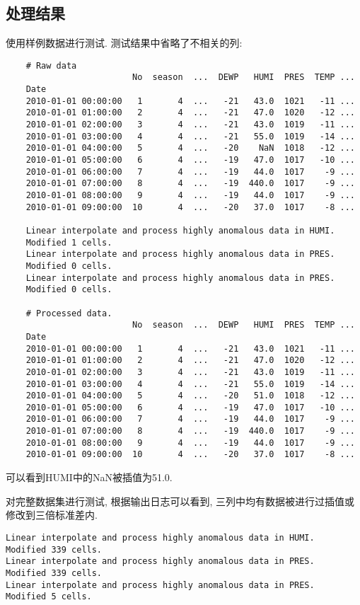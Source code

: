 \subsection{处理结果}
使用样例数据进行测试. 测试结果中省略了不相关的列:
\begin{lstlisting}
    # Raw data
                         No  season  ...  DEWP   HUMI  PRES  TEMP ...
    Date
    2010-01-01 00:00:00   1       4  ...   -21   43.0  1021   -11 ...
    2010-01-01 01:00:00   2       4  ...   -21   47.0  1020   -12 ...
    2010-01-01 02:00:00   3       4  ...   -21   43.0  1019   -11 ...
    2010-01-01 03:00:00   4       4  ...   -21   55.0  1019   -14 ...
    2010-01-01 04:00:00   5       4  ...   -20    NaN  1018   -12 ...
    2010-01-01 05:00:00   6       4  ...   -19   47.0  1017   -10 ...
    2010-01-01 06:00:00   7       4  ...   -19   44.0  1017    -9 ...
    2010-01-01 07:00:00   8       4  ...   -19  440.0  1017    -9 ...
    2010-01-01 08:00:00   9       4  ...   -19   44.0  1017    -9 ...
    2010-01-01 09:00:00  10       4  ...   -20   37.0  1017    -8 ...

    Linear interpolate and process highly anomalous data in HUMI.
    Modified 1 cells.
    Linear interpolate and process highly anomalous data in PRES.
    Modified 0 cells.
    Linear interpolate and process highly anomalous data in PRES.
    Modified 0 cells.

    # Processed data.
                         No  season  ...  DEWP   HUMI  PRES  TEMP ...
    Date
    2010-01-01 00:00:00   1       4  ...   -21   43.0  1021   -11 ...
    2010-01-01 01:00:00   2       4  ...   -21   47.0  1020   -12 ...
    2010-01-01 02:00:00   3       4  ...   -21   43.0  1019   -11 ...
    2010-01-01 03:00:00   4       4  ...   -21   55.0  1019   -14 ...
    2010-01-01 04:00:00   5       4  ...   -20   51.0  1018   -12 ...
    2010-01-01 05:00:00   6       4  ...   -19   47.0  1017   -10 ...
    2010-01-01 06:00:00   7       4  ...   -19   44.0  1017    -9 ...
    2010-01-01 07:00:00   8       4  ...   -19  440.0  1017    -9 ...
    2010-01-01 08:00:00   9       4  ...   -19   44.0  1017    -9 ...
    2010-01-01 09:00:00  10       4  ...   -20   37.0  1017    -8 ...
\end{lstlisting}
可以看到HUMI中的NaN被插值为51.0.

对完整数据集进行测试, 根据输出日志可以看到, 三列中均有数据被进行过插值或修改到三倍标准差内.
\begin{lstlisting}
Linear interpolate and process highly anomalous data in HUMI.
Modified 339 cells.
Linear interpolate and process highly anomalous data in PRES.
Modified 339 cells.
Linear interpolate and process highly anomalous data in PRES.
Modified 5 cells.
\end{lstlisting}